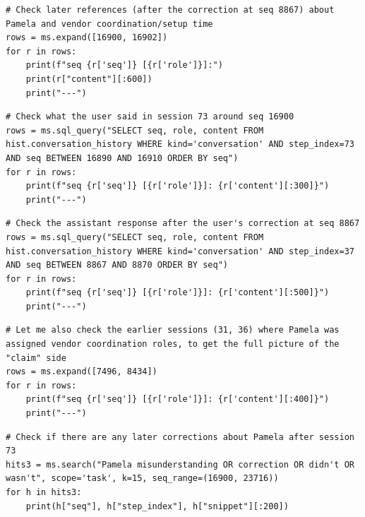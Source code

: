 \begin{lstlisting}[style=scroll, caption={Expansion of the post-correction mentions (\texttt{seq} 16900, 16902).}, label={lst:cr-c4}]
# Check later references (after the correction at seq 8867) about Pamela and vendor coordination/setup time
rows = ms.expand([16900, 16902])
for r in rows:
    print(f"seq {r['seq']} [{r['role']}]:")
    print(r["content"][:600])
    print("---")
\end{lstlisting}

\begin{lstlisting}[style=scroll, caption={Provenance check---the user turns around \texttt{seq} 16900.}, label={lst:cr-c5}]
# Check what the user said in session 73 around seq 16900
rows = ms.sql_query("SELECT seq, role, content FROM hist.conversation_history WHERE kind='conversation' AND step_index=73 AND seq BETWEEN 16890 AND 16910 ORDER BY seq")
for r in rows:
    print(f"seq {r['seq']} [{r['role']}]: {r['content'][:300]}")
    print("---")
\end{lstlisting}

\begin{lstlisting}[style=scroll, caption={The assistant's uptake of the correction (\texttt{seq} 8868).}, label={lst:cr-c6}]
# Check the assistant response after the user's correction at seq 8867
rows = ms.sql_query("SELECT seq, role, content FROM hist.conversation_history WHERE kind='conversation' AND step_index=37 AND seq BETWEEN 8867 AND 8870 ORDER BY seq")
for r in rows:
    print(f"seq {r['seq']} [{r['role']}]: {r['content'][:500]}")
    print("---")
\end{lstlisting}

\begin{lstlisting}[style=scroll, caption={The original claim side (Sessions 31 and 36).}, label={lst:cr-c7}]
# Let me also check the earlier sessions (31, 36) where Pamela was assigned vendor coordination roles, to get the full picture of the "claim" side
rows = ms.expand([7496, 8434])
for r in rows:
    print(f"seq {r['seq']} [{r['role']}]: {r['content'][:400]}")
    print("---")
\end{lstlisting}

\begin{lstlisting}[style=scroll, caption={\texttt{seq\_range}-bounded search over the remainder of the history, proving no later reversal.}, label={lst:cr-c8}]
# Check if there are any later corrections about Pamela after session 73
hits3 = ms.search("Pamela misunderstanding OR correction OR didn't OR wasn't", scope='task', k=15, seq_range=(16900, 23716))
for h in hits3:
    print(h["seq"], h["step_index"], h["snippet"][:200])
\end{lstlisting}

